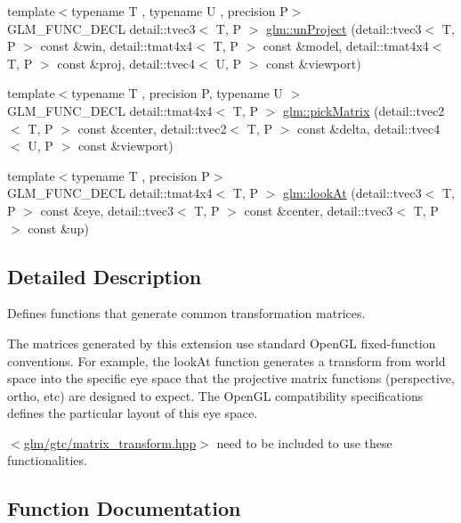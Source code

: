 \begin{DoxyCompactItemize}
\item 
{\footnotesize template$<$typename T , typename U , precision P$>$ }\\G\+L\+M\+\_\+\+F\+U\+N\+C\+\_\+\+D\+E\+CL detail\+::tvec3$<$ T, P $>$ \hyperlink{group__gtc__matrix__transform_ga4b0a9086d15e2a743ecd7b6128146af1}{glm\+::un\+Project} (detail\+::tvec3$<$ T, P $>$ const \&win, detail\+::tmat4x4$<$ T, P $>$ const \&model, detail\+::tmat4x4$<$ T, P $>$ const \&proj, detail\+::tvec4$<$ U, P $>$ const \&viewport)
\item 
{\footnotesize template$<$typename T , precision P, typename U $>$ }\\G\+L\+M\+\_\+\+F\+U\+N\+C\+\_\+\+D\+E\+CL detail\+::tmat4x4$<$ T, P $>$ \hyperlink{group__gtc__matrix__transform_ga0fb64f04bf5ad52523fcd4b10b46aff6}{glm\+::pick\+Matrix} (detail\+::tvec2$<$ T, P $>$ const \&center, detail\+::tvec2$<$ T, P $>$ const \&delta, detail\+::tvec4$<$ U, P $>$ const \&viewport)
\item 
{\footnotesize template$<$typename T , precision P$>$ }\\G\+L\+M\+\_\+\+F\+U\+N\+C\+\_\+\+D\+E\+CL detail\+::tmat4x4$<$ T, P $>$ \hyperlink{group__gtc__matrix__transform_ga454fdf3163c2779eeeeeb9d75907ce97}{glm\+::look\+At} (detail\+::tvec3$<$ T, P $>$ const \&eye, detail\+::tvec3$<$ T, P $>$ const \&center, detail\+::tvec3$<$ T, P $>$ const \&up)
\end{DoxyCompactItemize}


\subsection{Detailed Description}
Defines functions that generate common transformation matrices. 

The matrices generated by this extension use standard Open\+GL fixed-\/function conventions. For example, the look\+At function generates a transform from world space into the specific eye space that the projective matrix functions (perspective, ortho, etc) are designed to expect. The Open\+GL compatibility specifications defines the particular layout of this eye space.

$<$\hyperlink{matrix__transform_8hpp}{glm/gtc/matrix\+\_\+transform.\+hpp}$>$ need to be included to use these functionalities. 

\subsection{Function Documentation}
